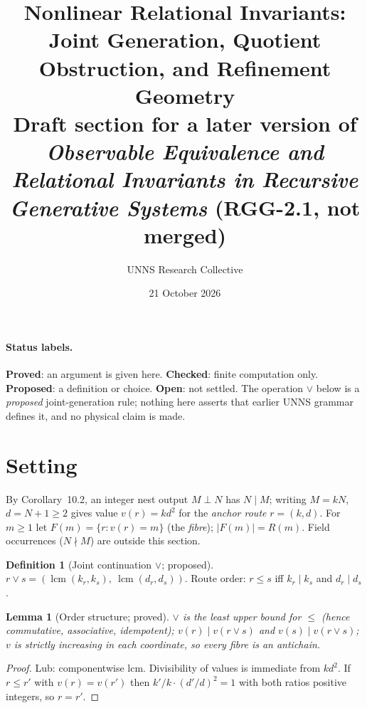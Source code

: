 \documentclass[11pt,a4paper]{article}
\title{Nonlinear Relational Invariants:\\ Joint Generation, Quotient Obstruction, and Refinement Geometry\\[2pt]
\large Draft section for a later version of \emph{Observable Equivalence and Relational Invariants in Recursive Generative Systems} (RGG-2.1, not merged)}
\author{UNNS Research Collective}
\date{21 October 2026}
\newtheorem{lemma}[theorem]{Lemma}
\theoremstyle{definition}
\newtheorem{definition}[theorem]{Definition}
\newcommand{\lcm}{\operatorname{lcm}}
\newcommand{\vj}{\mathbin{\vee}}
\begin{document}
\maketitle

\paragraph{Status labels.} \textbf{Proved}: an argument is given here. \textbf{Checked}: finite computation only. \textbf{Proposed}: a definition or choice. \textbf{Open}: not settled. The operation $\vj$ below is a \emph{proposed} joint-generation rule; nothing here asserts that earlier UNNS grammar defines it, and no physical claim is made.

\section{Setting}
By Corollary~10.2, an integer nest output $M\perp N$ has $N\mid M$; writing $M=kN$, $d=N+1\ge 2$ gives value $v(r)=kd^2$ for the \emph{anchor route} $r=(k,d)$. For $m\ge1$ let $F(m)=\{r: v(r)=m\}$ (the \emph{fibre}); $|F(m)|=R(m)$. Field occurrences ($N\nmid M$) are outside this section.

\begin{definition}[Joint continuation $\vj$; proposed]
$r\vj s=(\lcm(k_r,k_s),\ \lcm(d_r,d_s))$. Route order: $r\le s$ iff $k_r\mid k_s$ and $d_r\mid d_s$.
\end{definition}

\begin{lemma}[Order structure; proved]\label{lem:order}
$\vj$ is the least upper bound for $\le$ (hence commutative, associative, idempotent); $v(r)\mid v(r\vj s)$ and $v(s)\mid v(r\vj s)$; $v$ is strictly increasing in each coordinate, so every fibre is an antichain.
\end{lemma}
\begin{proof}
Lub: componentwise lcm. Divisibility of values is immediate from $kd^2$. If $r\le r'$ with $v(r)=v(r')$ then $k'/k\cdot (d'/d)^2=1$ with both ratios positive integers, so $r=r'$.
\end{proof}
\end{document}
